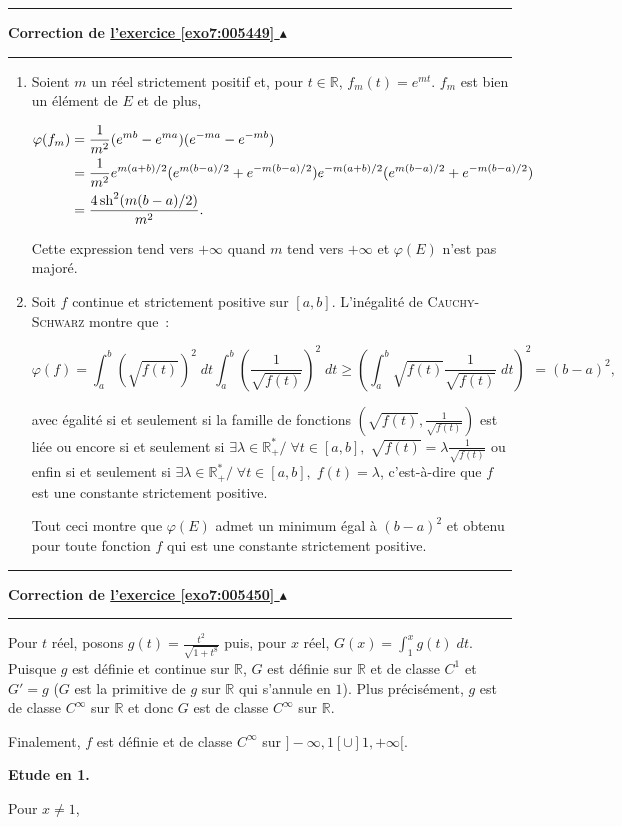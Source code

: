 \documentclass[11pt,a4paper]{article}
\newcommand{\Rr}{\mathbb{R}} \newcommand{\R}{\mathbb{R}}
\newcommand{\sh}{\mathop{\mathrm{sh}}\nolimits}
\newcounter{exo}
\newcommand{\correction}[1]{\hypertarget{cor7:#1}{}\label{cor7:#1}{\bf Correction de \hyperlink{exo7:#1}{l'exercice \ref{exo7:#1} $\blacktriangle$}}\vspace{1mm}\hrule\vspace{1mm}}
\newcommand{\fincorrection}{\vspace{1mm}\hrule\vspace*{7mm}}
\begin{document}
\fincorrection
\correction{005449}
\begin{enumerate}
\item  Soient $m$ un réel strictement positif et, pour $t\in\Rr$, $f_m(t)=e^{mt}$. $f_m$ est bien un élément de $E$ et de plus,

\begin{align*}\ensuremath
\varphi(f_m)&=\frac{1}{m^2}(e^{mb}-e^{ma})(e^{-ma}-e^{-mb})\\
 &=\frac{1}{m^2}e^{m(a+b)/2}(e^{m(b-a)/2}+e^{-m(b-a)/2})e^{-m(a+b)/2}(e^{m(b-a)/2}+e^{-m(b-a)/2})\\
 &=\frac{4\sh^2(m(b-a)/2)}{m^2}.
\end{align*} 

Cette expression tend vers $+\infty$ quand $m$ tend vers $+\infty$ et $\varphi(E)$ n'est pas majoré.

\item  Soit $f$ continue et strictement positive sur $[a,b]$. L'inégalité 
de \textsc{Cauchy}-\textsc{Schwarz} montre que~:

$$\varphi(f)=\int_{a}^{b}\left(\sqrt{f(t)}\right)^2\;dt\int_{a}^{b}\left(\frac{1}{\sqrt{f(t)}}\right)^2\;dt\geq\left(
\int_{a}^{b}\sqrt{f(t)}\frac{1}{\sqrt{f(t)}}\;dt\right)^2=(b-a)^2,$$

avec égalité si et seulement si la famille de fonctions $(\sqrt{f(t)},\frac{1}{\sqrt{f(t)}})$ est liée ou encore si et seulement si $\exists\lambda\in\Rr_+^*/\;\forall t\in[a,b],\;\sqrt{f(t)}=\lambda\frac{1}{\sqrt{f(t)}}$ ou enfin si et seulement si $\exists\lambda\in\Rr_+^*/\;\forall t\in[a,b],\;f(t)=\lambda$, c'est-à-dire que $f$ est une constante strictement positive.

Tout ceci montre que $\varphi(E)$ admet un minimum égal à $(b-a)^2$ et obtenu pour toute fonction $f$ qui est une  constante strictement positive.
\end{enumerate}
\fincorrection
\correction{005450}
Pour $t$ réel, posons $g(t)=\frac{t^2}{\sqrt{1+t^8}}$ puis, pour $x$ réel, $G(x)=\int_{1}^{x}g(t)\;dt$. Puisque $g$ est définie et continue sur $\Rr$, $G$ est définie sur $\Rr$ et de classe $C^1$ et $G'=g$ ($G$ est la primitive de $g$ sur $\Rr$ qui s'annule en $1$). Plus précisément, $g$ est de classe $C^\infty$ sur $\Rr$ et donc $G$ est de classe $C^\infty$ sur $\Rr$.

Finalement, $f$ est définie et de classe $C^\infty$ sur $]-\infty,1[\cup]1,+\infty[$.

\textbf{Etude en 1.}

Pour $x\neq1$, 
\end{document}
